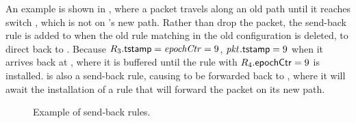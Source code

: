 An example is shown in , where a packet \pktID{}
travels along an old path until it reaches switch , which
is not on \pktID{}'s new path.  Rather than drop the packet, the
send-back rule  is added to  when the old rule
 matching \pktID{} in the old configuration is deleted, to
direct \pktID{} back to .  Because
$\ruleID{3}{\tagTmpField} = \epochIdx = 9$, $\pktID{}{\tagTmpField} =
9$ when it arrives back at , where it is buffered until
the rule  with $\ruleID{4}{\epochField} = 9$ is installed.
 is also a send-back rule, causing \pktID{} to be forwarded
back to , where it will await the installation of a rule
that will forward the packet on its new path.

\begin{figure}
\centering
\resizebox{0.75\linewidth}{!}{\small}
\caption{Example of send-back rules.}
\label{fig:send-back}
\end{figure}

\medskip

\hspace*{-\parindent}

